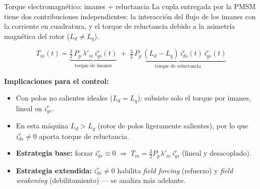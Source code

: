 \documentclass[aspectratio=169,t]{beamer}
\begin{document}
\begin{frame}{Torque electromagnético: imanes + reluctancia}
{\small\color{uncGray}La cupla entregada por la PMSM tiene dos contribuciones independientes: la interacción del flujo de los imanes con la corriente en cuadratura, y el torque de reluctancia debido a la asimetría magnética del rotor ($L_d\neq L_q$).}\par
\vspace{8mm}

\begin{equation*}
\boxed{\;\;
T_m(t) = \underbrace{\tfrac{3}{2}\,P_p\,\lambda'_m\,i^{r}_{qs}(t)}_{\text{torque de imanes}} \;+\; \underbrace{\tfrac{3}{2}\,P_p\,(L_d - L_q)\,i^{r}_{ds}(t)\,i^{r}_{qs}(t)}_{\text{torque de reluctancia}}
\;\;}
\end{equation*}

\vspace{8mm}
\textbf{Implicaciones para el control:}
\begin{itemize}\small
\item Con polos no salientes ideales ($L_d=L_q$): subsiste solo el torque por imanes, lineal en $i^{r}_{qs}$.
\item En esta máquina $L_d>L_q$ (rotor de polos ligeramente salientes), por lo que $i^{r}_{ds}\neq 0$ aporta torque de reluctancia.
\item \textbf{Estrategia base:} forzar $i^{r}_{ds}\equiv 0 \;\Rightarrow\; T_m = \tfrac{3}{2}P_p\lambda'_m\,i^{r}_{qs}$ (lineal y desacoplado).
\item \textbf{Estrategia extendida:} $i^{r}_{ds}\neq 0$ habilita \emph{field forcing} (refuerzo) y \emph{field weakening} (debilitamiento) — se analiza más adelante.
\end{itemize}
\end{frame}

\end{document}
